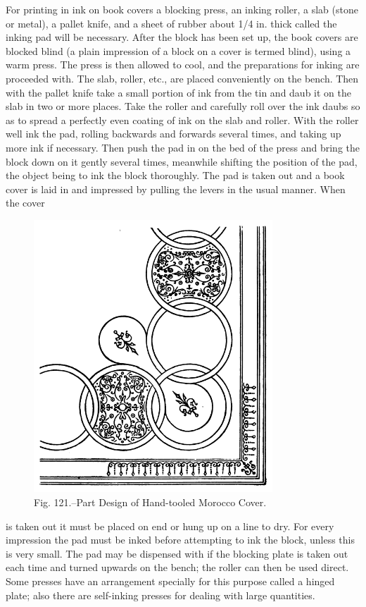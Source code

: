 \documentclass[twoside]{book}
\begin{document}
For printing in ink on book covers a blocking
press, an inking roller, a slab (stone or metal), a
pallet knife, and a sheet of rubber about 1/4 in. thick
called the inking pad will be necessary. After the
block has been set up, the book covers are blocked
blind (a plain impression of a block on a cover is
termed blind), using a warm press. The press is
then allowed to cool, and the preparations for inking
are proceeded with. The slab, roller, etc., are
placed conveniently on the bench. Then with the
pallet knife take a small portion of ink from the
tin and daub it on the slab in two or more places.
Take the roller and carefully roll over the ink daubs
so as to spread a perfectly even coating of ink on
the slab and roller. With the roller well ink the
pad, rolling backwards and forwards several times,
and taking up more ink if necessary. Then push
the pad in on the bed of the press and bring the
\pagebreak
block down on it gently several times, meanwhile
shifting the position of the pad, the object being to
ink the block thoroughly. The pad is taken out
and a book cover is laid in and impressed by pulling
the levers in the usual manner. When the cover
	\begin{figure}[h]
		\centering
		\includegraphics[width=0.8\textwidth]{Figures/_121.png}
		\caption*{Fig. 121.--Part Design of Hand-tooled Morocco Cover.}
	\end{figure}
is taken out it must be placed on end or hung up on
a line to dry. For every impression the pad must
be inked before attempting to ink the block, unless
this is very small. The pad may be dispensed with
if the blocking plate is taken out each time and
turned upwards on the bench; the roller can then
\pagebreak
be used direct. Some presses have an arrangement
specially for this purpose called a hinged plate;
also there are self-inking presses for dealing with
large quantities.
\end{document}
